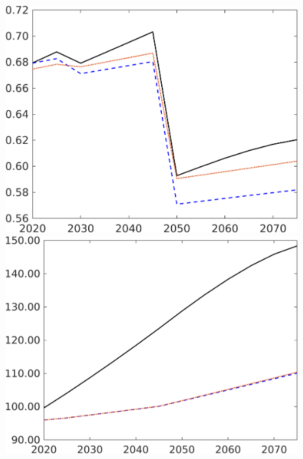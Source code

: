 \begin{figure}[h!!]
\begin{minipage}[]{0.32\textwidth}
	\end{minipage}
	\begin{minipage}[]{0.32\textwidth}
		\includegraphics[width=1\textwidth]{../../codding_model/own_basedOnFried/optimalPol_elastS_DisuSci/figures/all_1705/C_CompEffOPT_T_NoTaus_spillover0_sep1_BN0_ineq0_etaa0.79_lgd0.png}
	\end{minipage}
	\begin{minipage}[]{0.32\textwidth}
		\includegraphics[width=1\textwidth]{../../codding_model/own_basedOnFried/optimalPol_elastS_DisuSci/figures/all_1705/Ag_CompEffOPT_T_NoTaus_spillover0_sep1_BN0_ineq0_etaa0.79_lgd0.png}

\end{minipage}
\end{figure}
